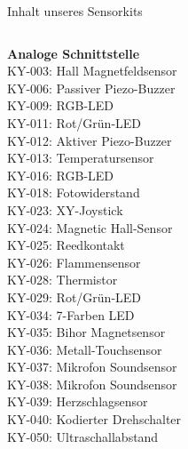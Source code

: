 {
\scriptsize

\begin{frame}{Inhalt unseres Sensorkits}
    \begin{columns}[onlytextwidth]
        \textbf{Analoge Schnittstelle} \\
        KY-003: Hall Magnetfeldsensor \\
        KY-006: Passiver Piezo-Buzzer \\
        KY-009: RGB-LED \\
        KY-011: Rot/Grün-LED \\
        KY-012: Aktiver Piezo-Buzzer \\
        KY-013: Temperatursensor \\
        KY-016: RGB-LED \\
        KY-018: Fotowiderstand \\
        KY-023: XY-Joystick \\
        KY-024: Magnetic Hall-Sensor \\
        KY-025: Reedkontakt \\
        KY-026: Flammensensor \\
        KY-028: Thermistor \\
        KY-029: Rot/Grün-LED \\
        KY-034: 7-Farben LED \\
        KY-035: Bihor Magnetsensor \\
        KY-036: Metall-Touchsensor \\
        KY-037: Mikrofon Soundsensor \\
        KY-038: Mikrofon Soundsensor \\
        KY-039: Herzschlagsensor \\
        KY-040: Kodierter Drehschalter \\
        KY-050: Ultraschallabstand \\


\end{columns}
\end{frame}}
